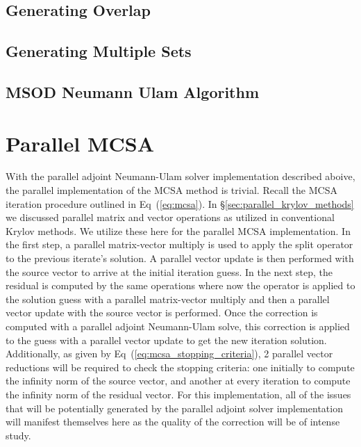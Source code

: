 \subsection{Generating Overlap}
\label{subsec:msod_overlap}

\subsection{Generating Multiple Sets}
\label{subsec:msod_sets}

\subsection{MSOD Neumann Ulam Algorithm}
\label{subsec:msod_algorithm}

\section{Parallel MCSA}
\label{sec:parallel_mcsa}
With the parallel adjoint Neumann-Ulam solver implementation described
aboive, the parallel implementation of the MCSA method is
trivial. Recall the MCSA iteration procedure outlined in
Eq~(\ref{eq:mcsa}). In \S\ref{sec:parallel_krylov_methods} we
discussed parallel matrix and vector operations as utilized in
conventional Krylov methods. We utilize these here for the parallel
MCSA implementation. In the first step, a parallel matrix-vector
multiply is used to apply the split operator to the previous iterate's
solution. A parallel vector update is then performed with the source
vector to arrive at the initial iteration guess. In the next step, the
residual is computed by the same operations where now the operator is
applied to the solution guess with a parallel matrix-vector multiply
and then a parallel vector update with the source vector is
performed. Once the correction is computed with a parallel adjoint
Neumann-Ulam solve, this correction is applied to the guess with a
parallel vector update to get the new iteration
solution. Additionally, as given by
Eq~(\ref{eq:mcsa_stopping_criteria}), 2 parallel vector reductions
will be required to check the stopping criteria: one initially to
compute the infinity norm of the source vector, and another at every
iteration to compute the infinity norm of the residual vector. For
this implementation, all of the issues that will be potentially
generated by the parallel adjoint solver implementation will manifest
themselves here as the quality of the correction will be of intense
study.

